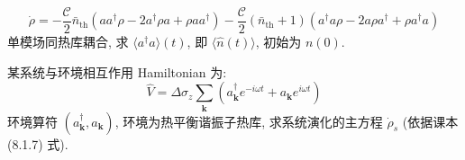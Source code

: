 \documentclass{assignment}
\begin{document}
\begin{prob}
    \[
        \dot{\rho}=-\frac{\mathscr{C}}{2}\bar{n}_{\text{th}}(aa^{\dagger}\rho-2a^{\dagger}\rho a+\rho aa^{\dagger})-\frac{\mathscr{C}}{2}(\bar{n}_{\text{th}}+1)(a^{\dagger}a\rho-2a\rho a^{\dagger}+\rho a^{\dagger}a)
    \]
    单模场同热库耦合, 求 $\langle a^{\dagger}a\rangle(t)$, 即 $\langle\hat{n}(t)\rangle$, 初始为 $n(0)$.
\end{prob}
\begin{sol}
    
\end{sol}

\begin{prob}
    某系统与环境相互作用 Hamiltonian 为:
    \[
        \hat{V}=\Delta\sigma_z\sum_{\bm{k}}(a_{\bm{k}}^{\dagger}e^{-i\omega t}+a_{\bm{k}}e^{i\omega t})
    \]
    环境算符 $(a_{\bm{k}}^{\dagger},a_{\bm{k}})$, 环境为热平衡谐振子热库, 求系统演化的主方程 $\dot{\rho}_{s}$ (依据课本 (8.1.7) 式).
\end{prob}
\begin{sol}
    
\end{sol}
\end{document}
